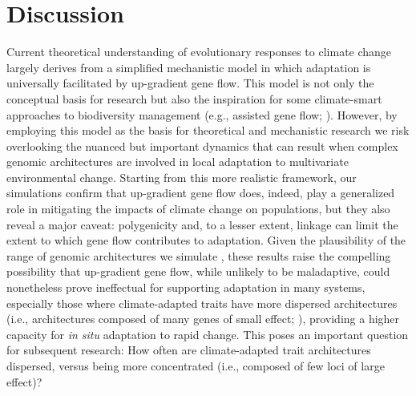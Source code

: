 \documentclass[9pt,twocolumn,twoside,lineno]{pnas-new}
\begin{document}
\section*{Discussion}

Current theoretical understanding of evolutionary responses to climate change
largely derives from a simplified mechanistic model in which
adaptation is universally facilitated by up-gradient gene flow.
This model is not only the conceptual basis for research
but also the inspiration for some climate-smart
approaches to biodiversity management
(e.g., assisted gene flow; \cite{aitken_whitlock}).
However, by employing this model as the basis
for theoretical and mechanistic research
we risk overlooking the nuanced but important dynamics that
can result when complex genomic architectures
are involved in local adaptation
to multivariate environmental change.
Starting from this more realistic framework,
our simulations confirm that up-gradient gene flow does, indeed,
play a generalized role in mitigating
the impacts of climate change on populations,
but they also reveal a major caveat:
polygenicity and, to a lesser extent, linkage
can limit the extent to which
gene flow contributes to adaptation.
Given the plausibility of the range of genomic architectures we simulate
\cite{barghi_polygenic,boyle,rockman,savolainen,sella,bomblies},
these results raise the compelling
possibility that up-gradient gene flow, while unlikely
to be maladaptive, could nonetheless prove
ineffectual for supporting adaptation in many systems,
especially those where climate-adapted traits
have more dispersed architectures
(i.e., architectures composed of many genes of small effect; \cite{yeaman_review}),
providing a higher capacity for \textit{in situ} adaptation to rapid change.
This poses an important question for subsequent research:
How often are climate-adapted trait architectures dispersed,
versus being more concentrated (i.e., composed of
few loci of large effect)?
\end{document}
